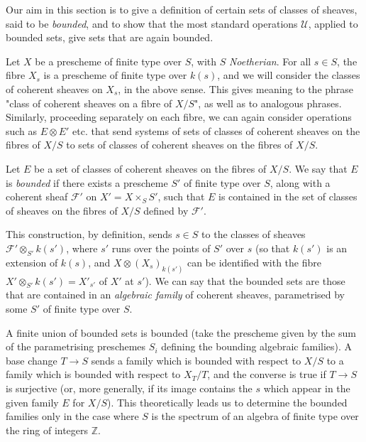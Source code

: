 Our aim in this section is to give a definition of certain sets of classes of sheaves, said to be \emph{bounded}, and to show that the most standard operations $\mathcal{U}$, applied to bounded sets, give sets that are again bounded.

Let $X$ be a prescheme of finite type over $S$, with $S$ \emph{Noetherian}.
For all $s\in S$, the fibre $X_s$ is a prescheme of finite type over $k(s)$, and we will consider the classes of coherent sheaves on $X_s$, in the above sense.
This gives meaning to the phrase "class of coherent sheaves on a fibre of $X/S$", as well as to analogous phrases.
Similarly, proceeding separately on each fibre, we can again consider operations such as $E\otimes E'$ etc. that send systems of sets of classes of coherent sheaves on the fibres of $X/S$ to sets of classes of coherent sheaves on the fibres of $X/S$.

\begin{definition}\label{fga3.iv-1-definition-1.1}
  Let $E$ be a set of classes of coherent sheaves on the fibres of $X/S$.
  We say that $E$ is \emph{bounded} if there exists a prescheme $S'$ of finite type over $S$, along with a coherent sheaf $\mathcal{F}'$ on $X'=X\times_S S'$, such that $E$ is contained in the set of classes of sheaves on the fibres of $X/S$ defined by $\mathcal{F}'$.
\end{definition}


This construction, by definition, sends $s\in S$ to the classes of sheaves $\mathcal{F}'\otimes_{S'}k(s')$, where $s'$ runs over the points of $S'$ over $s$ (so that $k(s')$ is an extension of $k(s)$, and $X\otimes (X_s)_{k(s')}$ can be identified with the fibre $X'\otimes_{S'}k(s')=X'_{s'}$ of $X'$ at $s'$).
We can say that the bounded sets are those that are contained in an \emph{algebraic family} of coherent sheaves, parametrised by some $S'$ of finite type over $S$.

A finite union of bounded sets is bounded (take the prescheme given by the sum of the parametrising preschemes $S_i$ defining the bounding algebraic families).
A base change $T\to S$ sends a family which is bounded with respect to $X/S$ to a family which is bounded with respect to $X_T/T$, and the converse is true if $T\to S$ is surjective (or, more generally, if its image contains the $s$ which appear in the given family $E$ for $X/S$).
This theoretically leads us to determine the bounded families only in the case where $S$ is the spectrum of an algebra of finite type over the ring of integers $\mathbb{Z}$.

